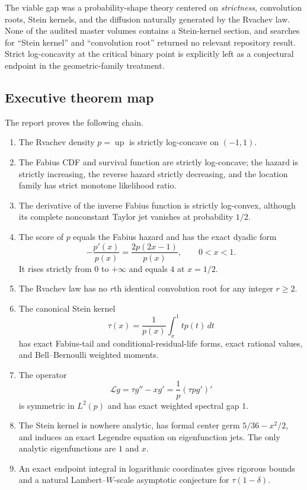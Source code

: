 \documentclass[11pt,oneside]{article}
\theoremstyle{definition}
\theoremstyle{remark}
\newcommand{\Up}{\operatorname{up}}
\begin{document}
The viable gap was a probability-shape theory centered on \emph{strictness},
convolution roots, Stein kernels, and the diffusion naturally generated by the
Rvachev law.  None of the audited master volumes contains a Stein-kernel section,
and searches for ``Stein kernel'' and ``convolution root'' returned no relevant
repository result.  Strict log-concavity at the critical binary point is explicitly
left as a conjectural endpoint in the geometric-family treatment.

\subsection{Executive theorem map}
The report proves the following chain.

\begin{enumerate}[label=\textbf{R\arabic*.},leftmargin=3.2em]
\item The Rvachev density $p=\Up$ is strictly log-concave on $(-1,1)$.
\item The Fabius CDF and survival function are strictly log-concave; the hazard is strictly increasing, the reverse hazard strictly decreasing, and the location family has strict monotone likelihood ratio.
\item The derivative of the inverse Fabius function is strictly log-convex, although its complete nonconstant Taylor jet vanishes at probability $1/2$.
\item The score of $p$ equals the Fabius hazard and has the exact dyadic form
\[
 -\frac{p'(x)}{p(x)}=\frac{2p(2x-1)}{p(x)},\qquad 0<x<1.
\]
It rises strictly from $0$ to $+\infty$ and equals $4$ at $x=1/2$.
\item The Rvachev law has no $r$th identical convolution root for any integer $r\ge2$.
\item The canonical Stein kernel
\[
 \tau(x)=\frac{1}{p(x)}\int_x^1 t p(t)\,dt
\]
has exact Fabius-tail and conditional-residual-life forms, exact rational values,
and Bell--Bernoulli weighted moments.
\item The operator
\[
 \mathcal L g=\tau g''-xg'=\frac1p(\tau p g')'
\]
is symmetric in $L^2(p)$ and has exact weighted spectral gap $1$.
\item The Stein kernel is nowhere analytic, has formal center germ
$5/36-x^2/2$, and induces an exact Legendre equation on eigenfunction jets.
The only analytic eigenfunctions are $1$ and $x$.
\item An exact endpoint integral in logarithmic coordinates gives rigorous bounds
and a natural Lambert--$W$-scale asymptotic conjecture for $\tau(1-\delta)$.
\end{enumerate}
\end{document}
